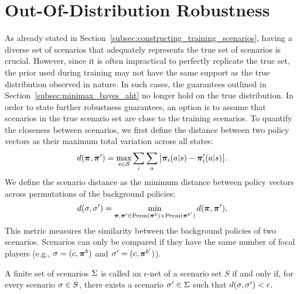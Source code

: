 \section{Out-Of-Distribution Robustness}
\label{section:ood}

As already stated in Section~\ref{subsec:constructing_training_scenarios}, having a diverse set of scenarios that adequately represents the true set of scenarios is crucial. However, since it is often impractical to perfectly replicate the true set, the prior used during training may not have the same support as the true distribution observed in nature. In such cases, the guarantees outlined in Section~\ref{subsec:minimax_bayes_aht} no longer hold on the true distribution. In order to state further robustness guarantees, an option is to assume that scenarios in the true scenario set are close to the training scenarios. To quantify the closeness between scenarios, we first define the distance between two policy vectors as their maximum total variation across all states:
\begin{equation}
    \label{eq:policy_vector_distance}
    d(\boldsymbol{\pi}, \boldsymbol{\pi}') = \max_{s\in \mathcal{S} }\sum_i \sum_a \big| \boldsymbol{\pi}_i(a|s) - \boldsymbol{\pi}'_i(a|s) \big|.
\end{equation}
We define the scenario distance as the minimum distance between policy vectors across permutations of the background policies:
\begin{equation}
    \label{eq:scenario_distance}
    d(\sigma, \sigma') = \min_{\boldsymbol{\pi}, \boldsymbol{\pi}' \in \text{Perm}(\boldsymbol{\pi}^b) \times \text{Perm}(\boldsymbol{\pi}^{b'})} d(\boldsymbol{\pi}, \boldsymbol{\pi}'),
\end{equation}
This metric measures the similarity between the background policies of two scenarios. Scenarios can only be compared if they have the same number of focal players (e.g., $\sigma=(c,\boldsymbol{\pi}^b)$ and $\sigma'=(c,\boldsymbol{\pi}^{b'})$).
\begin{definition} 
    A finite set of scenarios $\Sigma$ is called an $\epsilon$-net of a scenario set $S$ if and only if, for every scenario $\sigma\in S$, there exists a scenario $\sigma'\in\Sigma$ such that $d(\sigma,\sigma')<\epsilon$.
\end{definition}

